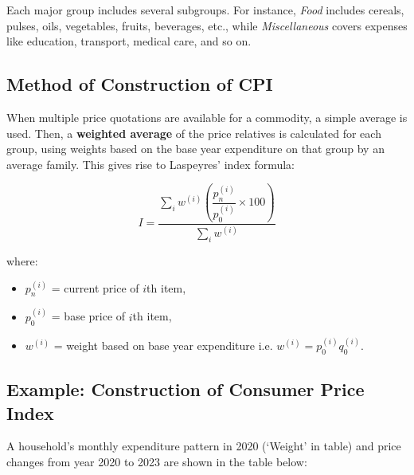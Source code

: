 \documentclass[twoside]{book}
\begin{document}
Each major group includes several subgroups. For instance, \textit{Food} includes cereals, pulses, oils, vegetables, fruits, beverages, etc., while \textit{Miscellaneous} covers expenses like education, transport, medical care, and so on.

\subsection{Method of Construction of CPI}
When multiple price quotations are available for a commodity, a simple average is used. Then, a \textbf{weighted average} of the price relatives is calculated for each group, using weights based on the base year expenditure on that group by an average family. This gives rise to Laspeyres’ index formula:
\begin{textbox}
\begin{equation*}
I = \dfrac{\sum_i w^{(i)} \left( \dfrac{p_n^{(i)}}{p_0^{(i)}} \times 100 \right)}{\sum_i w^{(i)}}
\end{equation*}
\end{textbox}

where:
\begin{itemize}
    \item $p_n^{(i)}$ = current price of $i$th item,
    \item $p_0^{(i)}$ = base price of $i$th item,
    \item $w^{(i)}$ = weight based on base year expenditure i.e. \( w^{(i)} = {p_0^{(i)} q_0^{(i)}} \).
\end{itemize}



\subsection{Example: Construction of Consumer Price Index}

A household's monthly expenditure pattern in 2020 (`Weight' in table) and price changes from year 2020 to 2023 are shown in the table below:
\end{document}
